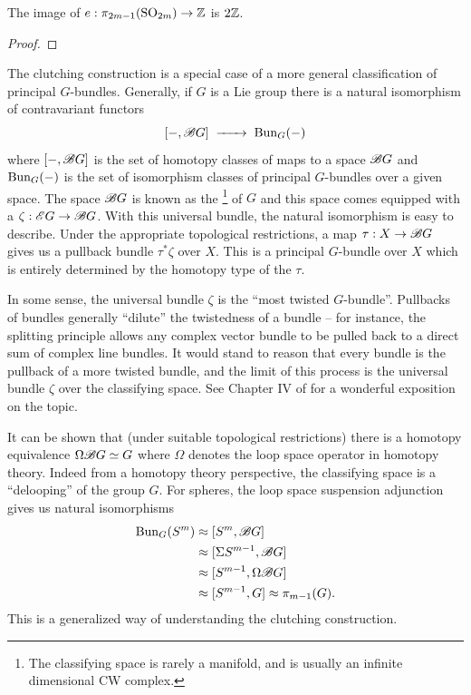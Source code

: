 \begin{corollary}\label{cor:expressible-euler-numbers-spheres}
	The image of $e : \pi_{2m-1}({\operatorname{SO}}_{2m})\to\mathbb{Z}$ is $2\mathbb{Z}$.
\end{corollary}
\begin{proof}
\end{proof}

\begin{remark}
	The clutching construction is a special case of a more general classification of principal $G$-bundles. Generally, if $G$ is a Lie group there is a natural isomorphism of contravariant functors
	\[
		[-, \Bclass G] \lkxto \Bun_G(-)
	\]
	where $[-, \mathscr{B} G]$ is the set of homotopy classes of maps to a space $\mathscr{B} G$ and $\operatorname{Bun}_G(-)$ is the set of isomorphism classes of principal $G$-bundles over a given space.
	The space $\mathscr{B} G$ is known as the \footnote{The classifying space is rarely a manifold, and is usually an infinite dimensional CW complex.} of $G$ and this space comes equipped with a  $\zeta : \mathscr{E} G \to \mathscr{B} G$. With this universal bundle, the natural isomorphism is easy to describe. Under the appropriate topological restrictions, a map $\tau : X \to \mathscr{B} G$ gives us a pullback bundle $\tau^*\zeta$ over $X$. This is a principal $G$-bundle over $X$ which is entirely determined by the homotopy type of the  $\tau$.

	In some sense, the universal bundle $\zeta$ is the ``most twisted $G$-bundle''. Pullbacks of bundles generally ``dilute'' the twistedness of a bundle -- for instance, the splitting principle allows any complex vector bundle to be pulled back to a direct sum of complex line bundles. It would stand to reason that every bundle is the pullback of a more twisted bundle, and the limit of this process is the universal bundle $\zeta$ over the classifying space. See Chapter IV of \cite{botttu1982differential} for a wonderful exposition on the topic.

	It can be shown that (under suitable topological restrictions) there is a homotopy equivalence $\Omega \mathscr{B} G \simeq G$ where $\Omega$ denotes the loop space operator in homotopy theory. Indeed from a homotopy theory perspective, the classifying space is a ``delooping'' of the group $G$. For spheres, the loop space suspension adjunction gives us natural isomorphisms
	\[
		\begin{aligned}
			\operatorname{Bun}_{G}(S^m) & \approx [S^m, \mathscr{B} G]            \\
			              & \approx [\Sigma S^{m-1}, \mathscr{B} G] \\
			              & \approx [S^{m-1}, \Omega\mathscr{B} G]  \\
			              & \approx [S^{m-1}, G]
			\approx \pi_{m-1}(G).
		\end{aligned}
	\]
	This is a generalized way of understanding the clutching construction.
\end{remark}

